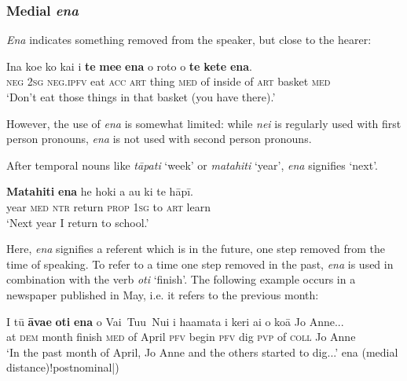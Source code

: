 \subsubsection[Medial ena]{Medial \textit{ena}}\label{sec:4.6.3.3}

\textit{Ena} indicates something removed from the speaker, but close to the hearer:

\ea\label{ex:4.212}
\gll {\ꞌ}Ina koe ko kai i \textbf{te} \textbf{me{\ꞌ}e} \textbf{ena} o roto o \textbf{te} \textbf{kete} \textbf{ena}. \\
\textsc{neg} \textsc{2sg} \textsc{neg.ipfv} eat \textsc{acc} \textsc{art} thing \textsc{med} of inside of \textsc{art} basket \textsc{med} \\

\glt
‘Don’t eat those things in that basket (you have there).’ \textstyleExampleref{[Blx-3.036]}
\z

However, the use of \textit{ena} is somewhat limited: while \textit{nei} is regularly used with first person pronouns, \textit{ena} is not used with second person pronouns.

After temporal nouns like \textit{tāpati} ‘week’ or \textit{matahiti} ‘year’, \textit{ena} signifies ‘next’.

\ea\label{ex:4.213}
\gll \textbf{Matahiti} \textbf{ena} he hoki a au ki te hāpī. \\
year \textsc{med} \textsc{ntr} return \textsc{prop} \textsc{1sg} to \textsc{art} learn \\

\glt
‘Next year I return to school.’ \textstyleExampleref{[R210.003]} 
\z

Here, \textit{ena} signifies a referent which is in the future, one step removed from the time of speaking. To refer to a time one step removed in the past, \textit{ena} is used in combination with the verb \textit{oti} ‘finish’. The following example occurs in a newspaper published in May, i.e. it refers to the previous month:

\ea\label{ex:4.214}
\gll {\ꞌ}I tū \textbf{{\ꞌ}āva{\ꞌ}e} \textbf{oti} \textbf{ena} o Vai~Tu{\ꞌ}u~Nui i ha{\ꞌ}amata i keri ai  o koā Jo Anne...\\
at \textsc{dem} month finish \textsc{med} of April \textsc{pfv} begin \textsc{pfv} dig \textsc{pvp}  of \textsc{coll} Jo Anne\\

\glt 
‘In the past month of April, Jo Anne and the others started to dig...’ \textstyleExampleref{[R647.106]} 
\z\is
{ena (medial distance)!postnominal|)}
